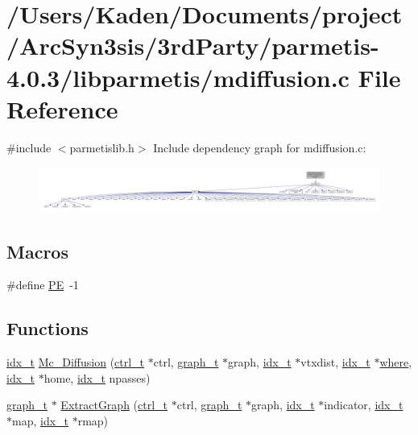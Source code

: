 \hypertarget{a00371}{}\section{/\+Users/\+Kaden/\+Documents/project/\+Arc\+Syn3sis/3rd\+Party/parmetis-\/4.0.3/libparmetis/mdiffusion.c File Reference}
\label{a00371}
{\ttfamily \#include $<$parmetislib.\+h$>$}\newline
Include dependency graph for mdiffusion.\+c\+:\nopagebreak
\begin{figure}[H]
\begin{center}
\leavevmode
\includegraphics[width=350pt]{a00372}
\end{center}
\end{figure}
\subsection*{Macros}
\begin{DoxyCompactItemize}
\item 
\#define \hyperlink{a00371_a211238ffe3627f42ca7b04bc96cc8fa6}{PE}~-\/1
\end{DoxyCompactItemize}
\subsection*{Functions}
\begin{DoxyCompactItemize}
\item 
\hyperlink{a00876_aaa5262be3e700770163401acb0150f52}{idx\+\_\+t} \hyperlink{a00371_a784a5e869479c028b824831459261587}{Mc\+\_\+\+Diffusion} (\hyperlink{a00742}{ctrl\+\_\+t} $\ast$ctrl, \hyperlink{a00734}{graph\+\_\+t} $\ast$graph, \hyperlink{a00876_aaa5262be3e700770163401acb0150f52}{idx\+\_\+t} $\ast$vtxdist, \hyperlink{a00876_aaa5262be3e700770163401acb0150f52}{idx\+\_\+t} $\ast$\hyperlink{a00879_a7a355801f721e9d8d4ae03590a3a56b0}{where}, \hyperlink{a00876_aaa5262be3e700770163401acb0150f52}{idx\+\_\+t} $\ast$home, \hyperlink{a00876_aaa5262be3e700770163401acb0150f52}{idx\+\_\+t} npasses)
\item 
\hyperlink{a00734}{graph\+\_\+t} $\ast$ \hyperlink{a00371_a78ca75095aef9df3b79518a334846184}{Extract\+Graph} (\hyperlink{a00742}{ctrl\+\_\+t} $\ast$ctrl, \hyperlink{a00734}{graph\+\_\+t} $\ast$graph, \hyperlink{a00876_aaa5262be3e700770163401acb0150f52}{idx\+\_\+t} $\ast$indicator, \hyperlink{a00876_aaa5262be3e700770163401acb0150f52}{idx\+\_\+t} $\ast$map, \hyperlink{a00876_aaa5262be3e700770163401acb0150f52}{idx\+\_\+t} $\ast$rmap)
\end{DoxyCompactItemize}


